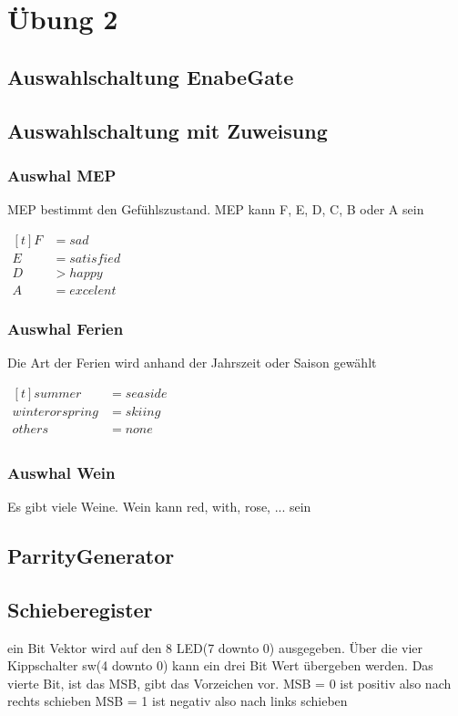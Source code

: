 \section{Übung 2}
\subsection{Auswahlschaltung EnabeGate}

\subsection{Auswahlschaltung mit Zuweisung}
\subsubsection{Auswhal MEP}
MEP bestimmt den Gefühlszustand.
MEP kann F, E, D, C, B oder A sein

$\begin{aligned}[t]
    F &= sad \\
    E &= satisfied\\
    D &> happy \\
    A &= excelent
\end{aligned}$


\subsubsection{Auswhal Ferien}
Die Art der Ferien wird anhand der Jahrszeit oder Saison gewählt
 
$\begin{aligned}[t]
    summer &= seaside \\
    winter or spring &= skiing\\
    others &= none \\
\end{aligned}$

\subsubsection{Auswhal Wein}
Es gibt viele Weine.
Wein kann  red, with, rose, ... sein
 

\subsection{ParrityGenerator}

\subsection{Schieberegister}
ein Bit Vektor wird auf den 8 LED(7 downto 0) ausgegeben. Über die vier Kippschalter sw(4 downto 0) kann ein drei Bit Wert übergeben werden. Das vierte Bit, ist das MSB, gibt das Vorzeichen vor.
MSB = 0 ist positiv also nach rechts schieben
MSB = 1 ist negativ also nach links schieben

